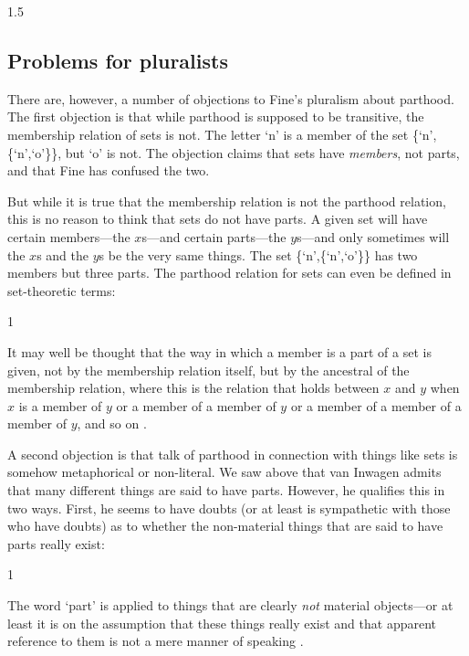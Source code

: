 \documentclass[11pt]{article}
\newenvironment{squote}{%
\begin{spacing}{1}
\begin{list}{}{%
\setlength{\labelwidth}{0pt}%
\rightmargin\leftmargin%
}
\item\relax
}{%
\end{list}%
\end{spacing}
}
\begin{document}
\begin{spacing}{1.5}
\subsection{Problems for pluralists}
\label{sets}
There are, however, a number of objections to Fine's pluralism about
parthood.  The first objection is that while parthood is supposed to
be transitive, the membership relation of sets is not.  The letter `n'
is a member of the set \{`n',\{`n',`o'\}\}, but `o' is not.  The
objection claims that sets have {\em members}, not parts, and that
Fine has confused the two.

But while it is true that the membership relation is not the parthood
relation, this is no reason to think that sets do not have parts.  A
given set will have certain members---the $x$s---and certain
parts---the $y$s---and only sometimes will the $x$s and the $y$s be
the very same things.  The set \{`n',\{`n',`o'\}\} has two members
but three parts.  The parthood relation for sets can even be defined
in set-theoretic terms:

\begin{squote}
It may well be thought that the way in which a member is a part of a
set is given, not by the membership relation itself, but by the
ancestral of the membership relation, where this is the relation that
holds between $x$ and $y$ when $x$ is a member of $y$ or a member of a
member of $y$ or a member of a member of a member of $y$, and so on
\citep[563]{fine2010}.
\end{squote}

A second objection is that talk of parthood in connection with things
like sets is somehow metaphorical or non-literal.  We saw above that
van Inwagen admits that many different things are said to have parts.
However, he qualifies this in two ways.  First, he seems to have
doubts (or at least is sympathetic with those who have doubts) as to
whether the non-material things that are said to have parts really
exist:

\begin{squote}
The word `part' is applied to things that are clearly \emph{not}
material objects---or at least it is on the assumption that these
things really exist and that apparent reference to them is not a mere
manner of speaking \citep[19]{inwagen1995}.
\end{squote}


\end{spacing}
\end{document}

